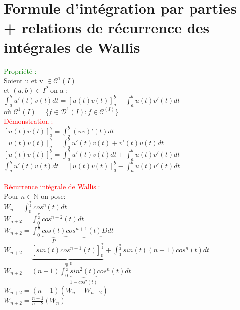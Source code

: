 \documentclass{article}
\begin{document}
	\section{Formule d'intégration par parties + relations de récurrence des intégrales de Wallis}
		\textcolor{green}{Propriété :} \\
		Soient u et v $\in \mathcal{C}^1(I)$ \\
		et $(a,b) \in I^2$  on a : \\
		$\int_a^b u'(t) v(t)dt = [u(t)v(t)]^b_a - \int_a^b u(t) v'(t) dt$ \\
		où $\mathcal{C}^1(I)=\lbrace f \in \mathcal{D}^1(I) : f \in \mathcal{C}^(I) \rbrace $ \\
		\textcolor{red}{Démonstration :} \\
		$[u(t)v(t)]^b_a= \int_a^b(uv)'(t)dt$ \\
		$[u(t)v(t)]^b_a= \int_a^b u'(t) v(t) + v'(t) u(t) dt$ \\
		$[u(t)v(t)]^b_a= \int_a^b u'(t) v(t)dt + \int_a^b u(t) v'(t) dt$ \\
		$\int_a^b u'(t) v(t)dt = [u(t)v(t)]^b_a - \int_a^b u(t) v'(t) dt$ \\ \\
		\textcolor{red}{Récurrence intégrale de Wallis :} \\
		Pour $n \in \mathbb{N}$ on pose: \\
		$W_n= \int_0^{\frac{\pi}{2}}cos^n(t)dt$ \\
		$W_{n+2}= \int_0^{\frac{\pi}{2}}cos^{n+2}(t)dt$ \\
		$W_{n+2}= \int_0^{\frac{\pi}{2}}\underbrace{cos(t)}_{P} \underbrace{cos^{n+1}(t)}{D}dt$ \\
		$W_{n+2}=\underbrace{[sin(t)cos^{n+1}(t)]^{\frac{\pi}{2}}_0}_{=0} +\int_0^{\frac{\pi}{2}}sin(t) (n+1) cos^n(t)dt$ \\
		$W_{n+2}=(n+1)\int_0^{\frac{\pi}{2}}\underbrace{sin^2(t)}_{1-cos^2(t)}cos^n(t)dt$ \\
		$W_{n+2}=(n+1) (W_n-W_{n+2})$ \\
		$W_{n+2}=\frac{n+1}{n+2} (W_{n})$
	
\end{document}
